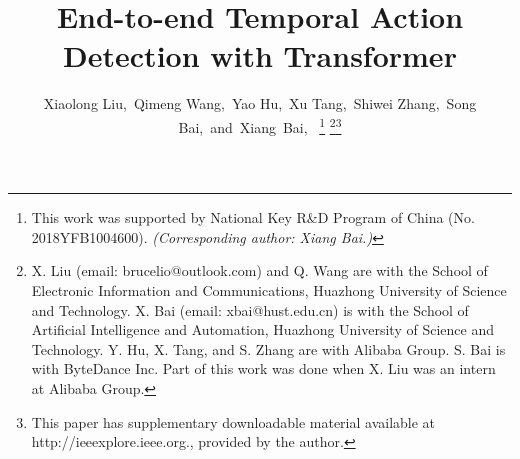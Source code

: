 \documentclass[lettersize,journal]{IEEEtran}
\begin{document}
\title{End-to-end Temporal Action Detection with Transformer}

\author{Xiaolong Liu,~Qimeng Wang,~Yao Hu,~Xu Tang,~Shiwei Zhang,~Song Bai,~and~Xiang~Bai,~
\thanks{This work was supported by National Key R\&D Program of China (No. 2018YFB1004600). \textit{(Corresponding author: Xiang Bai.)}}
\thanks{X. Liu (email: brucelio@outlook.com) and Q. Wang are with the School of Electronic Information and Communications, Huazhong University of Science and Technology. X. Bai (email: xbai@hust.edu.cn) is with the School of Artificial Intelligence and Automation, Huazhong University of Science and Technology. 
Y. Hu, X. Tang, and S. Zhang are with Alibaba Group. S. Bai is with ByteDance Inc.
Part of this work was done when X. Liu was an intern at Alibaba Group.}\thanks{This paper has supplementary downloadable material available at http://ieeexplore.ieee.org., provided by the author.}
}

\end{document}
